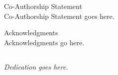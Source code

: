 \noindent \Large Co-Authorship Statement \normalsize \\

Co-Authorship Statement goes here.

\newpage

\noindent \Large Acknowledgments \normalsize \\

Acknowledgments go here.

\newpage
\begin{center}
  \section*{}
  \Large \textit{Dedication goes here.} \normalsize
\end{center}